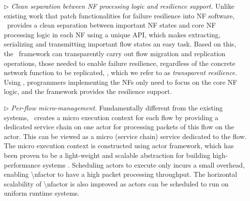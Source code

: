 $\triangleright$ {\em Clean separation between NF processing logic and resilience support.} Unlike existing work
\cite{gember2015opennf, sherry2015rollback} that patch functionalities for failure resilience into NF software, \nfactor~provides a clean separation between important NF states and core NF processing logic in each NF using a unique API, which makes extracting, serializing and transmitting important flow states an easy task.
Based on this, the \nfactor~framework can transparently carry out flow migration and replication operations, those needed to enable failure resilience, regardless of the concrete network function to be replicated, \ie, which we refer to as {\em transparent resilience}. Using \nfactor, programmers implementing the NFs only need to focus on the core NF logic, and the framework provides the resilience support. %


$\triangleright$ {\em Per-flow micro-management.} Fundamentally different from the existing systems, \nfactor~creates a micro execution context for each flow by providing a dedicated service chain on one actor for processing packets of this flow on the actor. This can be viewed as a micro (service chain) service dedicated to the flow.
The micro execution context is constructed using actor framework, which has been proven to be a light-weight and scalable abstraction for building high-performance systems \cite{newell2016optimizing}. \ac{Scheduling actors to execute only incurs a small overhead, enabling \nfactor to have a high packet processing throughput. The horizontal scalability of \nfactor is also improved as actors can be scheduled to run on uniform runtime systems. }



